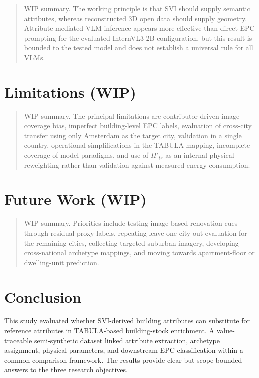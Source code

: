 \begin{quote}
WIP summary. The working principle is that SVI should supply semantic attributes, whereas reconstructed 3D open data should supply geometry. Attribute-mediated VLM inference appears more effective than direct EPC prompting for the evaluated InternVL3-2B configuration, but this result is bounded to the tested model and does not establish a universal rule for all VLMs.
\end{quote}


\section{Limitations (WIP)}
\label{sec:5_2}


\begin{quote}
WIP summary. The principal limitations are contributor-driven image-coverage bias, imperfect building-level EPC labels, evaluation of cross-city transfer using only Amsterdam as the target city, validation in a single country, operational simplifications in the TABULA mapping, incomplete coverage of model paradigms, and use of \(H'_{tr}\) as an internal physical reweighting rather than validation against measured energy consumption.
\end{quote}


\section{Future Work (WIP)}
\label{sec:5_3}


\begin{quote}
WIP summary. Priorities include testing image-based renovation cues through residual proxy labels, repeating leave-one-city-out evaluation for the remaining cities, collecting targeted suburban imagery, developing cross-national archetype mappings, and moving towards apartment-floor or dwelling-unit prediction.
\end{quote}


\section{Conclusion}
\label{sec:5_4}


This study evaluated whether SVI-derived building attributes can substitute for reference attributes in TABULA-based building-stock enrichment. A value-traceable semi-synthetic dataset linked attribute extraction, archetype assignment, physical parameters, and downstream EPC classification within a common comparison framework. The results provide clear but scope-bounded answers to the three research objectives.



